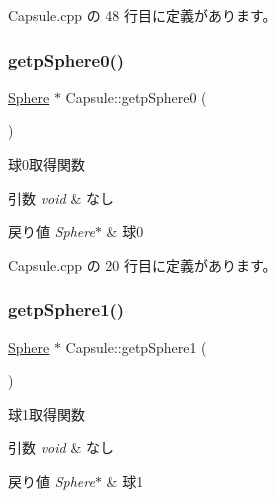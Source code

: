  Capsule.\+cpp の 48 行目に定義があります。

\mbox{\label{class_capsule_ad6590760125ad1b564bcd00fc9c0272e}} 
\subsubsection{\texorpdfstring{getp\+Sphere0()}{getpSphere0()}}
{\footnotesize\ttfamily \mbox{\hyperlink{class_sphere}{Sphere}} $\ast$ Capsule\+::getp\+Sphere0 (\begin{DoxyParamCaption}{ }\end{DoxyParamCaption})}



球0取得関数 


\begin{DoxyParams}{引数}
{\em void} & なし \\
\hline
\end{DoxyParams}

\begin{DoxyRetVals}{戻り値}
{\em Sphere$\ast$} & 球0 \\
\hline
\end{DoxyRetVals}


 Capsule.\+cpp の 20 行目に定義があります。

\mbox{\label{class_capsule_a3abd8375914c3ae6c5ff8ad585988d57}} 
\subsubsection{\texorpdfstring{getp\+Sphere1()}{getpSphere1()}}
{\footnotesize\ttfamily \mbox{\hyperlink{class_sphere}{Sphere}} $\ast$ Capsule\+::getp\+Sphere1 (\begin{DoxyParamCaption}{ }\end{DoxyParamCaption})}



球1取得関数 


\begin{DoxyParams}{引数}
{\em void} & なし \\
\hline
\end{DoxyParams}

\begin{DoxyRetVals}{戻り値}
{\em Sphere$\ast$} & 球1 \\
\hline
\end{DoxyRetVals}


